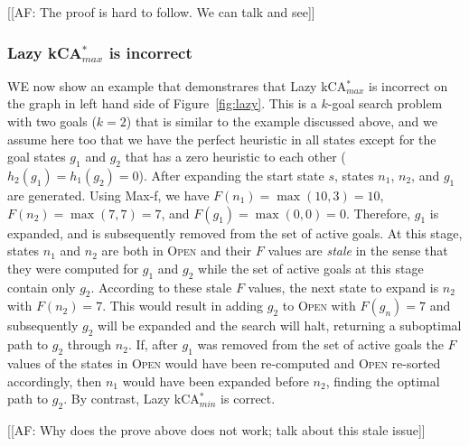 \documentclass{aicom2e}
\newcommand{\kgs}{$k$-goal search}
\newcommand{\kastarmin}{kCA$^*_{min}$}
\newcommand{\kastarmax}{kCA$^*_{max}$}
\newcommand{\maxf}{Max-f}
\newcommand{\open}{\textsc{Open}}
\begin{document}
[[AF: The proof is hard to follow. We can talk and see]]



\subsubsection*{Lazy \kastarmax{} is incorrect}

WE now show an example that demonstrares that Lazy \kastarmax{} is incorrect on
the graph in left hand side of Figure~\ref{fig:lazy}. This is a \kgs{} problem
with two goals ($k=2$) that is similar to the example discussed above, and we
assume here too that we have the perfect heuristic in all states except for the
goal states $g_1$ and $g_2$ that has a zero heuristic to each other
($h_2(g_1)=h_1(g_2)=0$). After expanding the start state $s$, states $n_1$,
$n_2$, and $g_1$ are generated. Using \maxf{}, we have $F(n_1)=\max(10,3)=10$,
$F(n_2)=\max(7,7)=7$, and $F(g_1)=\max(0,0)=0$. Therefore, $g_1$ is expanded,
and is subsequently removed from the set of active goals. At this stage, states
$n_1$ and $n_2$ are both in \open{} and their $F$ values are {\em stale} in the
sense that they were computed for $g_1$ and $g_2$ while the set of active goals
at this stage contain only $g_2$. According to these stale $F$ values, the next
state to expand is $n_2$ with $F(n_2)=7$. This would result in adding $g_2$ to
\open{} with $F(g_n)=7$ and subsequently $g_2$ will be expanded and the search
will halt, returning a suboptimal path to $g_2$ through $n_2$. If, after $g_1$
was removed from the set of active goals the $F$ values of the states in
\open{} would have been re-computed and \open{} re-sorted accordingly, then
$n_1$ would have been expanded before $n_2$, finding the optimal path to $g_2$.
By contrast, Lazy \kastarmin{} is correct.



[[AF: Why does the prove above does not work; talk about this stale issue]]



\end{document}
